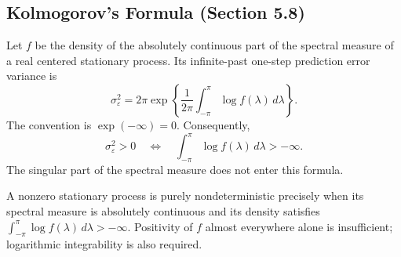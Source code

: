 \subsection{Kolmogorov's Formula (Section 5.8)}
\begin{theorem}
Let $f$ be the density of the absolutely continuous part of the spectral
measure of a real centered stationary process. Its infinite-past one-step
prediction error variance is
\[
\boxed{\displaystyle
\sigma_\varepsilon^2=2\pi\exp\left\{
\frac1{2\pi}\int_{-\pi}^{\pi}\log f(\lambda)\,d\lambda\right\}.}
\]
The convention is $\exp(-\infty)=0$. Consequently,
\[
\sigma_\varepsilon^2>0
\quad\Longleftrightarrow\quad
\int_{-\pi}^{\pi}\log f(\lambda)\,d\lambda>-\infty.
\]
The singular part of the spectral measure does not enter this formula.
\end{theorem}
\begin{corollary}
A nonzero stationary process is purely nondeterministic precisely when
its spectral measure is absolutely continuous and its density satisfies
$\int_{-\pi}^{\pi}\log f(\lambda)\,d\lambda>-\infty$.
Positivity of $f$ almost everywhere alone is insufficient; logarithmic
integrability is also required.
\end{corollary}
